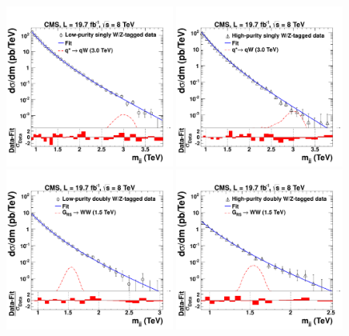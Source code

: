 \begin{figure}[th!b]
\centering
\includegraphics[width=0.49\textwidth]{EXO-12-024/figs/MediumPuriqVFitAndPull.pdf}
\includegraphics[width=0.49\textwidth]{EXO-12-024/figs/HighPuriqVFitAndPull.pdf}
\includegraphics[width=0.49\textwidth]{EXO-12-024/figs/MediumPuriVVFitAndPull.pdf}
\includegraphics[width=0.49\textwidth]{EXO-12-024/figs/HighPuriVVFitAndPull.pdf}

\end{figure}
